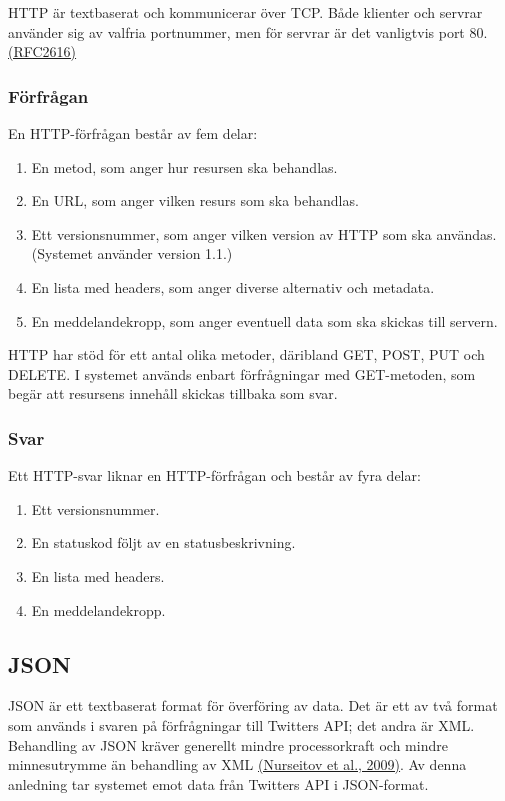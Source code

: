 \documentclass[a4paper,11pt]{article}
\begin{document}
HTTP är textbaserat och kommunicerar över TCP. Både klienter och servrar använder sig av valfria portnummer, men för servrar är det vanligtvis port 80. \hyperref[rfc2616]{(RFC2616)}

\subsubsection{Förfrågan}

En HTTP-förfrågan består av fem delar:
	
	\begin{enumerate}
    	\item En metod, som anger hur resursen ska behandlas.
    	\item En URL, som anger vilken resurs som ska behandlas.
    	\item Ett versionsnummer, som anger vilken version av HTTP som ska användas. (Systemet använder version 1.1.)
    	\item En lista med headers, som anger diverse alternativ och metadata.
    	\item En meddelandekropp, som anger eventuell data som ska skickas till servern.
	\end{enumerate}

HTTP har stöd för ett antal olika metoder, däribland GET, POST, PUT och DELETE. I systemet används enbart förfrågningar med GET-metoden, som begär att resursens innehåll skickas tillbaka som svar.
	
\subsubsection{Svar}
	
Ett HTTP-svar liknar en HTTP-förfrågan och består av fyra delar:

	\begin{enumerate}
    	\item Ett versionsnummer.
    	\item En statuskod följt av en statusbeskrivning.
    	\item En lista med headers.
    	\item En meddelandekropp.
    	\end{enumerate}

\subsection{JSON}
\label{sec:json}
JSON är ett textbaserat format för överföring av data. Det är ett av två format som används i svaren på förfrågningar till Twitters API; det andra är XML. Behandling av JSON kräver generellt mindre processorkraft och mindre minnesutrymme än behandling av XML \hyperref[paulson]{(Nurseitov et al., 2009)}. Av denna anledning tar systemet emot data från Twitters API i JSON-format.
\end{document}
